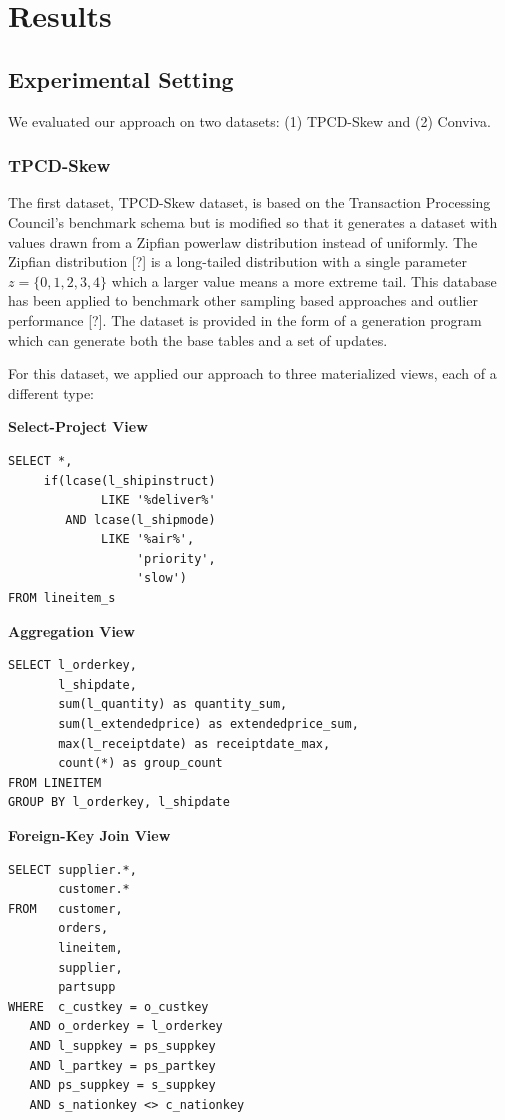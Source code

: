 \section{Results}

\subsection{Experimental Setting}
We evaluated our approach on two datasets: (1) TPCD-Skew and (2) Conviva.

\subsubsection{TPCD-Skew}
The first dataset, TPCD-Skew dataset, is based on the Transaction Processing Council's benchmark
schema but is modified so that it generates a dataset with values drawn from a Zipfian powerlaw distribution instead of uniformly.
The Zipfian distribution [?] is a long-tailed distribution with a single parameter $z=\{0,1,2,3,4\}$ which a larger
value means a more extreme tail.
This database has been applied to benchmark other sampling based approaches and outlier performance [?].
The dataset is provided in the form of a generation program which can generate both the base tables and a set of updates.

For this dataset, we applied our approach to three materialized views, each of a different type:
\vspace{1em}

\textbf{Select-Project View}
\begin{lstlisting}
SELECT *, 
     if(lcase(l_shipinstruct) 
     	     LIKE '%deliver%' 
        AND lcase(l_shipmode) 
             LIKE '%air%',
                  'priority',
                  'slow') 
FROM lineitem_s
\end{lstlisting}

\vspace{1em}

\textbf{Aggregation View}
\begin{lstlisting}
SELECT l_orderkey, 
       l_shipdate, 
       sum(l_quantity) as quantity_sum, 
       sum(l_extendedprice) as extendedprice_sum, 
       max(l_receiptdate) as receiptdate_max, 
       count(*) as group_count 
FROM LINEITEM 
GROUP BY l_orderkey, l_shipdate
\end{lstlisting}

\vspace{1em}

\textbf{Foreign-Key Join View}
\begin{lstlisting}
SELECT supplier.*, 
	   customer.* 
FROM   customer, 
       orders, 
       lineitem, 
       supplier, 
       partsupp 
WHERE  c_custkey = o_custkey 
   AND o_orderkey = l_orderkey 
   AND l_suppkey = ps_suppkey 
   AND l_partkey = ps_partkey 
   AND ps_suppkey = s_suppkey 
   AND s_nationkey <> c_nationkey
\end{lstlisting}

